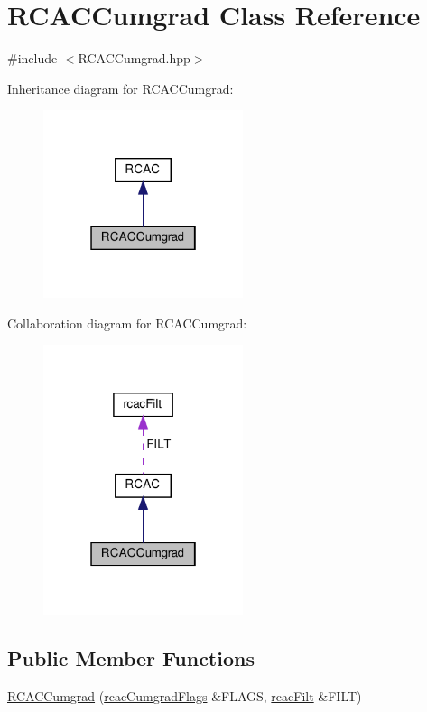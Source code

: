 \hypertarget{class_r_c_a_c_cumgrad}{}\section{R\+C\+A\+C\+Cumgrad Class Reference}
\label{class_r_c_a_c_cumgrad}


{\ttfamily \#include $<$R\+C\+A\+C\+Cumgrad.\+hpp$>$}



Inheritance diagram for R\+C\+A\+C\+Cumgrad\+:
\nopagebreak
\begin{figure}[H]
\begin{center}
\leavevmode
\includegraphics[width=166pt]{class_r_c_a_c_cumgrad__inherit__graph}
\end{center}
\end{figure}


Collaboration diagram for R\+C\+A\+C\+Cumgrad\+:
\nopagebreak
\begin{figure}[H]
\begin{center}
\leavevmode
\includegraphics[width=166pt]{class_r_c_a_c_cumgrad__coll__graph}
\end{center}
\end{figure}
\subsection*{Public Member Functions}
\begin{DoxyCompactItemize}
\item 
\hyperlink{class_r_c_a_c_cumgrad_af03fdcd5712a8ba9e9d29e10e6fe1afe}{R\+C\+A\+C\+Cumgrad} (\hyperlink{structrcac_cumgrad_flags}{rcac\+Cumgrad\+Flags} \&F\+L\+A\+GS, \hyperlink{structrcac_filt}{rcac\+Filt} \&F\+I\+LT)
\end{DoxyCompactItemize}
